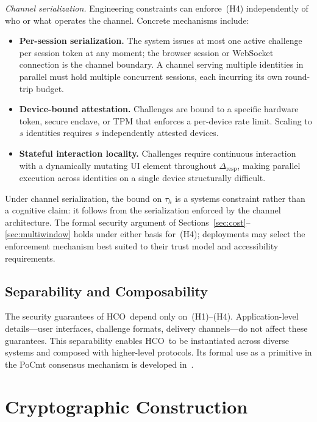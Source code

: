 \documentclass[11pt]{article}
\newcommand{\HCO}{HCO\xspace}
\theoremstyle{remark}
\theoremstyle{plain}
\begin{document}
	\emph{Channel serialization.}
	Engineering constraints can enforce~(H4) independently of who or what
	operates the channel. Concrete mechanisms include:
	\begin{itemize}
		\item \textbf{Per-session serialization.} The system issues at most
		one active challenge per session token at any moment; the browser
		session or WebSocket connection is the channel boundary. A channel
		serving multiple identities in parallel must hold multiple concurrent
		sessions, each incurring its own round-trip budget.
		\item \textbf{Device-bound attestation.} Challenges are bound to
		a specific hardware token, secure enclave, or TPM that enforces
		a per-device rate limit. Scaling to $s$ identities requires $s$
		independently attested devices.
		\item \textbf{Stateful interaction locality.} Challenges require
		continuous interaction with a dynamically mutating UI element
		throughout $\Delta_{\mathrm{resp}}$, making parallel execution across
		identities on a single device structurally difficult.
	\end{itemize}
	
	Under channel serialization, the bound on $\tau_h$ is a systems
	constraint rather than a cognitive claim: it follows from the
	serialization enforced by the channel architecture. The formal security
	argument of Sections~\ref{sec:cost}--\ref{sec:multiwindow} holds under
	either basis for~(H4); deployments may select the enforcement mechanism
	best suited to their trust model and accessibility requirements.
	
	\subsection{Separability and Composability}
	
	The security guarantees of \HCO\ depend only on~(H1)--(H4). Application-level
	details---user interfaces, challenge formats, delivery channels---do not affect
	these guarantees. This separability enables \HCO\ to be instantiated across
	diverse systems and composed with higher-level protocols. Its formal use as a
	primitive in the PoCmt consensus mechanism is developed
	in~\cite{maleki2026pocmt}.
	
	
	\section{Cryptographic Construction}
	\label{sec:construction}
	
\end{document}
